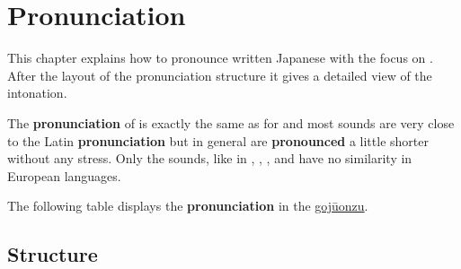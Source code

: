 \chapter{Pronunciation}
\label{chap:Pronunciation}\label{sec:Pronunciation}

This chapter explains how to pronounce written Japanese with the focus on
\jkanavoc. After the layout of the pronunciation structure it gives
a  detailed view of the intonation.

The \textbf{pronunciation} of \jkanavoc is exactly the same as for
\hyperref[sec:\jscript]{\jtopic} and most sounds are very close to the Latin
\textbf{pronunciation} but in general are \textbf{pronounced} a little shorter
without any stress. Only the  sounds, like in , ,
,  and  have no similarity in European languages.



The following table displays the \textbf{pronunciation} in the
\hyperref[sec:Gojuonzu]{gojūonzu}.



\section{Structure}

